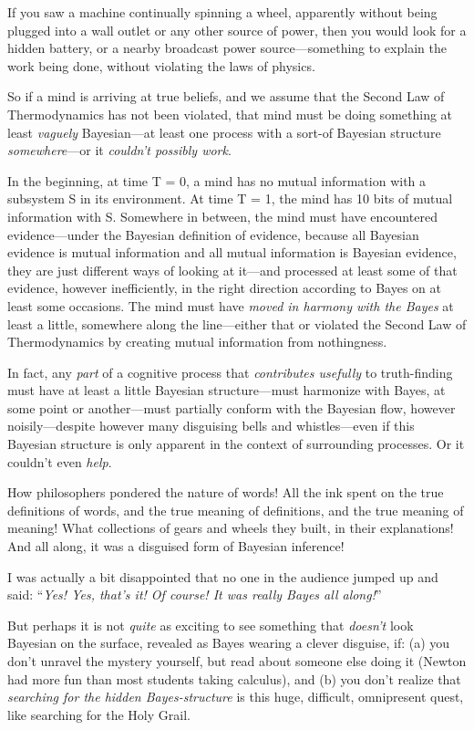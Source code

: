{
 If you saw a machine continually spinning a wheel, apparently
without being plugged into a wall outlet or any other source of power,
then you would look for a hidden battery, or a nearby broadcast power
source---something to explain the work being done, without violating
the laws of physics.}

{
 So if a mind is arriving at true beliefs, and we assume that the
Second Law of Thermodynamics has not been violated, that mind must be
doing something at least \textit{vaguely} Bayesian---at least one
process with a sort-of Bayesian structure \textit{somewhere}{}---or it
\textit{couldn't possibly work}.}

{
 In the beginning, at time T = 0, a mind has no mutual information
with a subsystem S in its environment. At time T = 1, the mind has 10
bits of mutual information with S. Somewhere in between, the mind must
have encountered evidence---under the Bayesian definition of evidence,
because all Bayesian evidence is mutual information and all mutual
information is Bayesian evidence, they are just different ways of
looking at it---and processed at least some of that evidence, however
inefficiently, in the right direction according to Bayes on at least
some occasions. The mind must have \textit{moved in harmony with the
Bayes} at least a little, somewhere along the line---either that or
violated the Second Law of Thermodynamics by creating mutual
information from nothingness.}

{
 In fact, any \textit{part} of a cognitive process that
\textit{contributes usefully} to truth-finding must have at least a
little Bayesian structure---must harmonize with Bayes, at some point or
another---must partially conform with the Bayesian flow, however
noisily---despite however many disguising bells and whistles---even if
this Bayesian structure is only apparent in the context of surrounding
processes. Or it couldn't even \textit{help}.}

{
 How philosophers pondered the nature of words! All the ink spent
on the true definitions of words, and the true meaning of definitions,
and the true meaning of meaning! What collections of gears and wheels
they built, in their explanations! And all along, it was a disguised
form of Bayesian inference!}

{
 I was actually a bit disappointed that no one in the audience
jumped up and said: ``\textit{Yes! Yes,
that's it! Of course! It was really Bayes all
along!}''}

{
 But perhaps it is not \textit{quite} as exciting to see something
that \textit{doesn't} look Bayesian on the surface,
revealed as Bayes wearing a clever disguise, if: (a) you
don't unravel the mystery yourself, but read about
someone else doing it (Newton had more fun than most students taking
calculus), and (b) you don't realize that
\textit{searching for the hidden Bayes-structure} is this huge,
difficult, omnipresent quest, like searching for the Holy Grail.}


